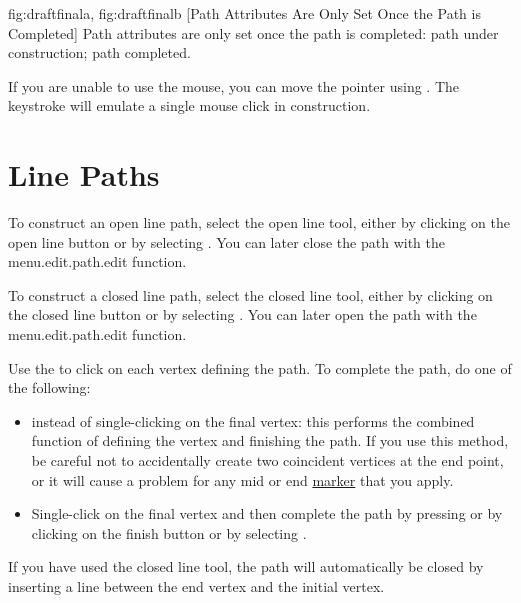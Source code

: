 {
 {fig:draftfinala}{}{},
 {fig:draftfinalb}{}{}
}
[Path Attributes Are Only Set Once the Path is Completed]
{Path attributes are only set once the path is completed:
 path under construction;
 path completed.}

If you are unable to use the mouse, you can move the pointer using
. The keystroke
 will emulate a single mouse
click in \gls{construction}.


\section{Line Paths}\label{sec:newlinepath}


To construct an open line \gls{path}, select the open line tool,
either by clicking on the open line button or by selecting
. You can later close the \gls{path}
with the \gls{menu.edit.path.edit} function.


To construct a closed line \gls{path}, select the closed line tool,
either by clicking on the closed line button or by selecting
. You can later open the \gls{path}
with the \gls{menu.edit.path.edit} function.

Use the  to click on each vertex
defining the path. To complete the \gls{path}, do one of the following:
\begin{itemize}
\item {} instead of single-clicking
on the final vertex: this performs the combined function of defining
the vertex and finishing the path. If you use this method, be
careful not to accidentally create two coincident vertices at the
end point, or it will cause a problem for any mid or end
\hyperref[sec:markers]{marker} that you apply.

\item Single-\gls{click} on the final vertex and then
complete the path by pressing  or by
clicking on the finish button or by selecting
.
\end{itemize}
If you have used the closed line tool, the path will automatically
be closed by inserting a line between the end vertex
and the initial vertex.

